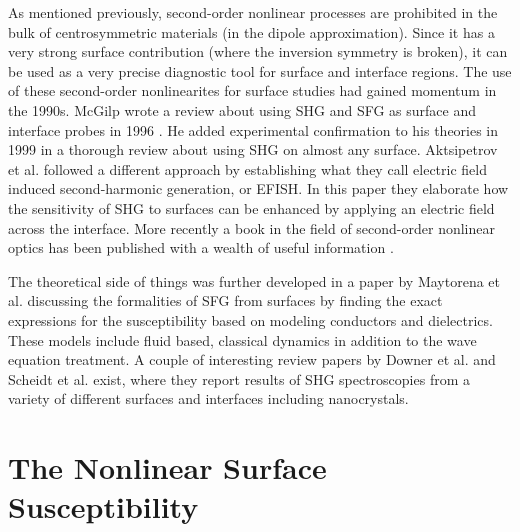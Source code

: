 As mentioned previously, second-order nonlinear processes are prohibited in the
bulk of centrosymmetric materials (in the dipole approximation). Since it has a
very strong surface contribution (where the inversion symmetry is broken), it
can be used as a very precise diagnostic tool for surface and interface regions.
The use of these second-order nonlinearites for surface studies had gained
momentum in the 1990s. McGilp wrote a review about using SHG and SFG as surface
and interface probes in 1996 \cite{mcgilp1996review}. He added experimental
confirmation to his theories in 1999 \cite{mcgilp1999second} in a thorough
review about using SHG on almost any surface. Aktsipetrov et al.
\cite{aktsipetrov1997dc} followed a different approach by establishing what they
call electric field induced second-harmonic generation, or EFISH. In this paper
they elaborate how the sensitivity of SHG to surfaces can be enhanced by
applying an electric field across the interface. More recently a book in the
field of second-order nonlinear optics has been published with a wealth of
useful information \cite{aktsipetrovbook}.

The theoretical side of things was further developed in a paper by Maytorena et
al. \cite{PhysRevB.57.2569} discussing the formalities of SFG from surfaces by
finding the exact expressions for the susceptibility based on modeling
conductors and dielectrics. These models include fluid based, classical dynamics
in addition to the wave equation treatment. A couple of interesting review
papers by Downer et al. \cite{downer2001optical} and Scheidt et al.
\cite{scheidt2004optical} exist, where they report results of SHG spectroscopies
from a variety of different surfaces and interfaces including nanocrystals.



\section{The Nonlinear Surface Susceptibility}\label{sec:introchi2}

